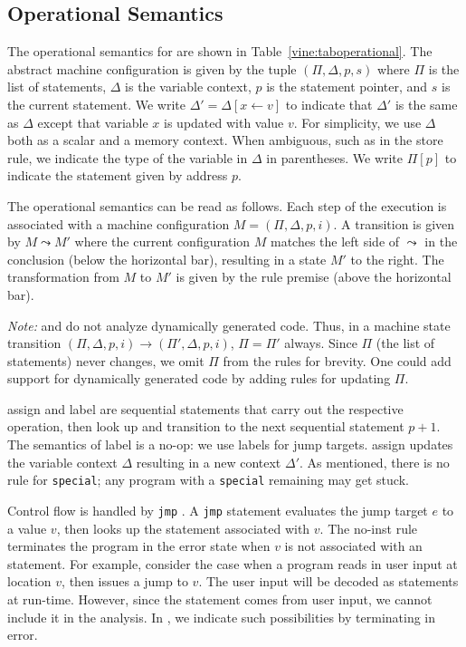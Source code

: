 \subsection{Operational Semantics}
\label{vine:operational}



The operational semantics for \bil are shown in
Table~\ref{vine:taboperational}.  The abstract machine configuration
is given by the tuple $(\Pi, \Delta, p, s)$ where $\Pi$ is the list of
statements, $\Delta$ is the variable context, $p$ is the statement
pointer, and $s$ is the current statement.  We write $\Delta' =
\Delta[x \leftarrow v]$ to indicate that $\Delta'$ is the same as
$\Delta$ except that variable $x$ is updated with value $v$.  For
simplicity, we use $\Delta$ both as a scalar and a memory
context. When ambiguous, such as in the {\sc store} rule, we indicate
the type of the variable in $\Delta$ in parentheses. We write $\Pi[p]$
to indicate the statement given by address $p$.

The operational semantics can be read as follows.  Each step of the
execution is associated with a machine configuration $M = (\Pi,
\Delta, p, i)$.  A transition is given by $M \leadsto M'$ where the
current configuration $M$ matches the left side of $\leadsto$ in the
conclusion (below the horizontal bar), resulting in a state $M'$ to
the right.  The transformation from $M$ to $M'$ is given by the rule
premise (above the horizontal bar). 

{\it Note:} \bap and \bil do not analyze dynamically generated
code. Thus, in a machine state transition $(\Pi, \Delta, p, i)
\rightarrow (\Pi', \Delta, p, i)$, $\Pi = \Pi'$ always. Since $\Pi$
(the list of statements) never changes, we omit $\Pi$ from the rules
for brevity. One could add support for dynamically generated code by
adding rules for updating $\Pi$. 


{\sc assign} and {\sc label} are sequential statements that carry
out the respective operation, then look up and transition to the next
sequential statement $p+1$. The semantics of {\sc label} is a no-op:
we use labels for jump targets.  {\sc assign} updates the variable
context $\Delta$ resulting in a new context $\Delta'$.  As mentioned,
there is no rule for {\tt special}; any program with a {\tt special}
remaining may get stuck.

Control flow is handled by {\tt jmp}%
. A {\tt jmp} statement
evaluates the jump target $e$ to a value $v$, then looks up the
statement associated with $v$.  The {\sc no-inst} rule terminates
the program in the error state when $v$ is not associated with an
statement. For example, consider the case when a program reads in
user input at location $v$, then issues a jump to $v$.  The user input
will be decoded as statements at run-time.  However, since the
statement comes from user input, we cannot include it in the analysis. In
\bap, we indicate such possibilities by terminating in error.




%

